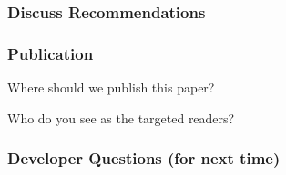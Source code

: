 \documentclass[t,12pt,numbers,fleqn]{beamer}
\begin{document}

\begin{frame}
\frametitle{Discuss Recommendations}

\bi
\item 
\ei

\end{frame}


\begin{frame}
\frametitle{Publication}

\bi
\item Where should we publish this paper?
\item Who do you see as the targeted readers?
\ei

\end{frame}


\begin{frame}
\frametitle{Developer Questions (for next time)}

\bi
\item 
\ei

\end{frame}

\end{document}

